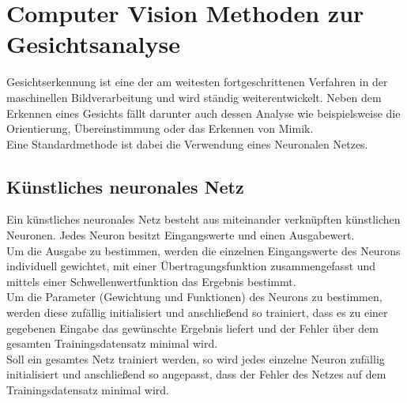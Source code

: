 \section{Computer Vision Methoden zur Gesichtsanalyse}
\label{Grundlagen}
Gesichtserkennung ist eine der am weitesten fortgeschrittenen Verfahren in der maschinellen Bildverarbeitung und wird ständig weiterentwickelt. Neben dem Erkennen eines Gesichts fällt darunter auch dessen Analyse wie beispielsweise die Orientierung, Übereinstimmung oder das Erkennen von Mimik.\\
Eine Standardmethode ist dabei die Verwendung eines Neuronalen Netzes.
\subsection{Künstliches neuronales Netz}
Ein künstliches neuronales Netz besteht aus miteinander verknüpften künstlichen Neuronen. Jedes Neuron besitzt Eingangswerte und einen Ausgabewert.\\
Um die Ausgabe zu bestimmen, werden die einzelnen Eingangswerte des Neurons individuell gewichtet, mit einer Übertragungsfunktion zusammengefasst und mittels einer Schwellenwertfunktion das Ergebnis bestimmt.\\
Um die Parameter (Gewichtung und Funktionen) des Neurons zu bestimmen, werden diese zufällig initialisiert und anschließend so trainiert, dass es zu einer gegebenen Eingabe das gewünschte Ergebnis liefert und der Fehler über dem gesamten Trainingsdatensatz minimal wird.\\
Soll ein gesamtes Netz trainiert werden, so wird jedes einzelne Neuron zufällig initialisiert und anschließend so angepasst, dass der Fehler des Netzes auf dem Trainingsdatensatz minimal wird.
\cite{Maschin_Neuron}
